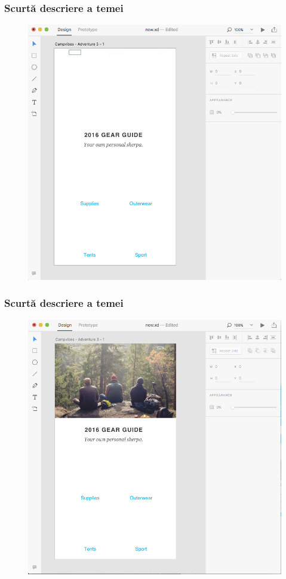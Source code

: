 \documentclass{beamer}
\begin{document}

\begin{frame}
\frametitle{Scurtă descriere a temei}
\begin{figure}
\includegraphics[scale=0.2]{img/label.png}
\end{figure}
\end{frame}


\begin{frame}
\frametitle{Scurtă descriere a temei}
\begin{figure}
\includegraphics[scale=0.2]{img/image.png}
\end{figure}
\end{frame}
\end{document}
